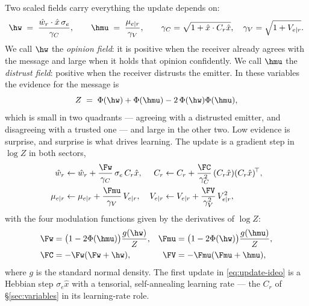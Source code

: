 Two scaled fields carry everything the update depends on:
%
\begin{equation}
  \hw \;=\; \frac{\hat{w}_r\cdot\hat{x}\,\sigma_e}{\gamma_C},
  \qquad
  \hmu \;=\; \frac{\mu_{e|r}}{\gamma_V},
  \qquad
  \gamma_C=\sqrt{1+\hat{x}\cdot C_r\hat{x}},\quad \gamma_V=\sqrt{1+V_{e|r}} .
  \label{eq:fields}
\end{equation}
%
We call $\hw$ the \emph{opinion field}: it is positive when the receiver already
agrees with the message and large when it holds that opinion confidently. We call
$\hmu$ the \emph{distrust field}: positive when the receiver distrusts the emitter.
In these variables the evidence for the message is
%
\begin{equation}
  Z \;=\; \Phi(\hw) + \Phi(\hmu) - 2\,\Phi(\hw)\Phi(\hmu),
  \label{eq:evidence}
\end{equation}
%
which is small in two quadrants --- agreeing with a distrusted emitter, and
disagreeing with a trusted one --- and large in the other two. Low evidence is
surprise, and surprise is what drives learning. The update is a gradient step in
$\log Z$ in both sectors,
%
\begin{align}
  \hat{w}_r &\leftarrow \hat{w}_r + \frac{\Fw}{\gamma_C}\,\sigma_e\,C_r\hat{x},
  &
  C_r &\leftarrow C_r + \frac{\FC}{\gamma_C^{2}}\,(C_r\hat{x})(C_r\hat{x})^{\!\top},
  \label{eq:update-ideo}\\
  \mu_{e|r} &\leftarrow \mu_{e|r} + \frac{\Fmu}{\gamma_V}\,V_{e|r},
  &
  V_{e|r} &\leftarrow V_{e|r} + \frac{\FV}{\gamma_V^{2}}\,V_{e|r}^{2},
  \label{eq:update-aff}
\end{align}
%
with the four modulation functions given by the derivatives of $\log Z$:
%
\begin{align}
  \Fw &= \bigl(1-2\Phi(\hmu)\bigr)\frac{g(\hw)}{Z},
  &\Fmu &= \bigl(1-2\Phi(\hw)\bigr)\frac{g(\hmu)}{Z},
  \nonumber\\
  \FC &= -\Fw(\Fw+\hw),
  &\FV &= -\Fmu(\Fmu+\hmu),
  \label{eq:modulation}
\end{align}
%
where $g$ is the standard normal density. The first update in
\eqref{eq:update-ideo} is a Hebbian step $\sigma_e\hat{x}$ with a tensorial,
self-annealing learning rate --- the $C_r$ of \S\ref{sec:variables} in its
learning-rate role.

